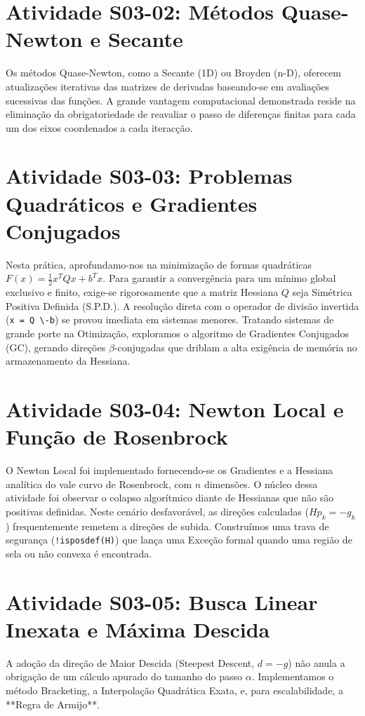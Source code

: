\documentclass[preprint,12pt]{elsarticle}
\begin{document}
\section{Atividade S03-02: M\'etodos Quase-Newton e Secante}
\label{sec:s0302}
Os m\'etodos Quase-Newton, como a Secante (1D) ou Broyden (n-D), oferecem atualiza\c{c}\~oes iterativas das matrizes de derivadas baseando-se em avalia\c{c}\~oes sucessivas das fun\c{c}\~oes. A grande vantagem computacional demonstrada reside na elimina\c{c}\~ao da obrigatoriedade de reavaliar o passo de diferen\c{c}as finitas para cada um dos eixos coordenados a cada iterac\c{c}\~ao.

\section{Atividade S03-03: Problemas Quadr\'aticos e Gradientes Conjugados}
\label{sec:s0303}
Nesta pr\'atica, aprofundamo-nos na minimiza\c{c}\~ao de formas quadr\'aticas $F(x) = \frac{1}{2} x^T Q x + b^T x$. Para garantir a converg\^encia para um m\'inimo global exclusivo e finito, exige-se rigorosamente que a matriz Hessiana $Q$ seja Sim\'etrica Positiva Definida (S.P.D.). 
A resolu\c{c}\~ao direta com o operador de divis\~ao invertida (\texttt{x = Q \textbackslash -b}) se provou imediata em sistemas menores. Tratando sistemas de grande porte na Otimiza\c{c}\~ao, exploramos o algoritmo de Gradientes Conjugados (GC), gerando dire\c{c}\~oes $\beta$-conjugadas que driblam a alta exig\^encia de mem\'oria no armazenamento da Hessiana.

\section{Atividade S03-04: Newton Local e Fun\c{c}\~ao de Rosenbrock}
\label{sec:s0304}
O Newton Local foi implementado fornecendo-se os Gradientes e a Hessiana anal\'itica do vale curvo de Rosenbrock, com $n$ dimens\~oes.
O n\'ucleo dessa atividade foi observar o colapso algor\'itmico diante de Hessianas que n\~ao s\~ao positivas definidas. Neste cen\'ario desfavor\'avel, as dire\c{c}\~oes calculadas ($H p_k = -g_k$) frequentemente remetem a dire\c{c}\~oes de subida. Constru\'imos uma trava de seguran\c{c}a (\texttt{!isposdef(H)}) que lan\c{c}a uma Exce\c{c}\~ao formal quando uma regi\~ao de sela ou n\~ao convexa \'e encontrada.

\section{Atividade S03-05: Busca Linear Inexata e M\'axima Descida}
\label{sec:s0305}
A ado\c{c}\~ao da dire\c{c}\~ao de Maior Descida (Steepest Descent, $d = -g$) n\~ao anula a obriga\c{c}\~ao de um c\'alculo apurado do tamanho do passo $\alpha$. Implementamos o m\'etodo Bracketing, a Interpola\c{c}\~ao Quadr\'atica Exata, e, para escalabilidade, a **Regra de Armijo**.
\end{document}
